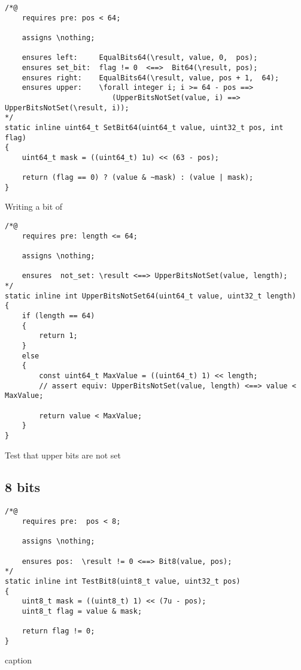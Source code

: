 \begin{listing}[hbt]
\begin{minipage}{0.99\textwidth}
\begin{lstlisting}[style=acsl-block]
/*@
    requires pre: pos < 64;

    assigns \nothing;

    ensures left:     EqualBits64(\result, value, 0,  pos);
    ensures set_bit:  flag != 0  <==>  Bit64(\result, pos);
    ensures right:    EqualBits64(\result, value, pos + 1,  64);
    ensures upper:    \forall integer i; i >= 64 - pos ==>
                         (UpperBitsNotSet(value, i) ==> UpperBitsNotSet(\result, i));
*/
static inline uint64_t SetBit64(uint64_t value, uint32_t pos, int flag)
{
    uint64_t mask = ((uint64_t) 1u) << (63 - pos);

    return (flag == 0) ? (value & ~mask) : (value | mask);
}
\end{lstlisting}
\end{minipage}
\caption{\label{lst:SetBit64}Writing a bit of }
\end{listing}

\begin{listing}[hbt]
\begin{minipage}{0.99\textwidth}
\begin{lstlisting}[style=acsl-block]
/*@
    requires pre: length <= 64;

    assigns \nothing;

    ensures  not_set: \result <==> UpperBitsNotSet(value, length);
*/
static inline int UpperBitsNotSet64(uint64_t value, uint32_t length)
{
    if (length == 64)
    {
        return 1;
    }
    else
    {
        const uint64_t MaxValue = ((uint64_t) 1) << length;
        // assert equiv: UpperBitsNotSet(value, length) <==> value < MaxValue;

        return value < MaxValue;
    }
}
\end{lstlisting}
\end{minipage}
\caption{\label{lst:UpperBitsNotSet64}Test that upper bits are not set}
\end{listing}


\FloatBarrier

\subsection{8 bits}
\begin{listing}[hbt]
\begin{minipage}{0.99\textwidth}
\begin{lstlisting}[style=acsl-block]
/*@
    requires pre:  pos < 8;

    assigns \nothing;

    ensures pos:  \result != 0 <==> Bit8(value, pos);
*/
static inline int TestBit8(uint8_t value, uint32_t pos)
{
    uint8_t mask = ((uint8_t) 1) << (7u - pos);
    uint8_t flag = value & mask;

    return flag != 0;
}
\end{lstlisting}
\end{minipage}
\caption{caption}
\end{listing}

